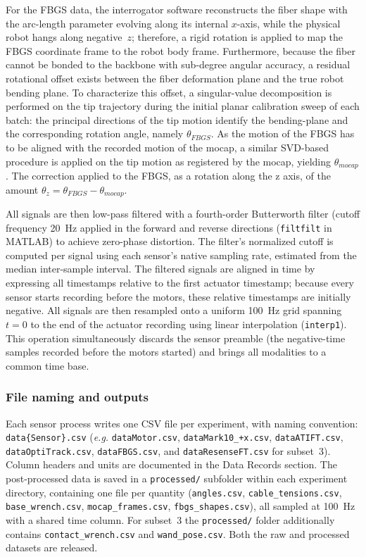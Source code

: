 \documentclass[14pt, a4paper]{article}
\newcommand{\eg}{\textit{e.g.}}
\begin{document}
For the FBGS data, the interrogator software reconstructs the fiber shape with the arc-length parameter evolving along its internal $x$-axis, while the physical robot hangs along negative~$z$; therefore, a rigid rotation is applied to map the FBGS coordinate frame to the robot body frame.
Furthermore, because the fiber cannot be bonded to the backbone with sub-degree angular accuracy, a residual rotational offset exists between the fiber deformation plane and the true robot bending plane.
To characterize this offset, a singular-value decomposition is performed on the tip trajectory during the initial planar calibration sweep of each batch: the principal directions of the tip motion identify the bending-plane and the corresponding rotation angle, namely $\theta_{FBGS}$.
As the motion of the FBGS has to be aligned with the recorded motion of the mocap, a similar SVD-based procedure is applied on the tip motion as registered by the mocap, yielding $\theta_{mocap}$.
The correction applied to the FBGS, as a rotation along the z axis, of the amount $\theta_z = \theta_{FBGS} - \theta_{mocap}$.

All signals are then low-pass filtered with a fourth-order Butterworth filter (cutoff frequency \SI{20}{\hertz} applied in the forward and reverse directions (\texttt{filtfilt} in MATLAB) to achieve zero-phase distortion.
The filter's normalized cutoff is computed per signal using each sensor's native sampling rate, estimated from the median inter-sample interval.
The filtered signals are aligned in time by expressing all timestamps relative to the first actuator timestamp; because every sensor starts recording before the motors, these relative timestamps are initially negative.
All signals are then resampled onto a uniform \SI{100}{\hertz} grid spanning $t = 0$ to the end of the actuator recording using linear interpolation (\texttt{interp1}).
This operation simultaneously discards the sensor preamble (the negative-time samples recorded before the motors started) and brings all modalities to a common time base.

\subsubsection{File naming and outputs}
Each sensor process writes one CSV file per experiment, with naming convention: \texttt{data\{Sensor\}.csv} (\eg{} \texttt{dataMotor.csv}, \texttt{dataMark10\_+x.csv}, \texttt{dataATIFT.csv}, \texttt{dataOptiTrack.csv}, \texttt{dataFBGS.csv}, and \texttt{dataResenseFT.csv} for subset~3).
Column headers and units are documented in the Data Records section.
The post-processed data is saved in a \texttt{processed/} subfolder within each experiment directory, containing one file per quantity (\texttt{angles.csv}, \texttt{cable\_tensions.csv}, \texttt{base\_wrench.csv}, \texttt{mocap\_frames.csv}, \texttt{fbgs\_shapes.csv}), all sampled at \SI{100}{\hertz} with a shared time column.
For subset~3 the \texttt{processed/} folder additionally contains \texttt{contact\_wrench.csv} and \texttt{wand\_pose.csv}.
Both the raw and processed datasets are released.
\end{document}
